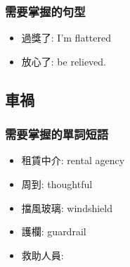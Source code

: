 \subsubsection*{需要掌握的句型}
\begin{multicols}{2}
\begin{itemize}
  \itemsep0em
  \item 過獎了: I'm flattered
  \item 放心了: be relieved.
\end{itemize}
\end{multicols}

\subsection{車禍}
\subsubsection*{需要掌握的單詞短語}
\begin{multicols}{3}
\begin{itemize}
  \itemsep0em
  \item 租賃中介: rental agency
  \item 周到: thoughtful
  \item 擋風玻璃: windshield
  \item 護欄: guardrail
  \item 救助人員: 
\end{itemize}
\end{multicols}

